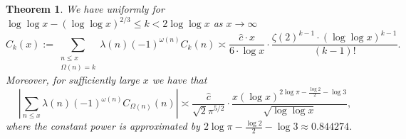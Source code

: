 \documentclass[11pt,reqno,a4letter]{article}
\numberwithin{figure}{section}
\numberwithin{table}{section}
\theoremstyle{plain}
\newtheorem{theorem}{Theorem}
\numberwithin{theorem}{section}
\theoremstyle{definition}
\begin{document}
\begin{theorem}
We have uniformly for 
$\log\log x - (\log\log x)^{2/3} \leq k < 2\log\log x$ 
as $x \rightarrow \infty$ 
\[
\widehat{C}_k(x) := 
     \sum_{\substack{n \leq x \\ \Omega(n) = k}} \lambda(n) (-1)^{\omega(n)} 
     C_k(n) \asymp \frac{\widehat{c} \cdot x}{6 \cdot \log x} \cdot 
     \frac{\zeta(2)^{k-1} \cdot (\log\log x)^{k-1}}{(k-1)!}. 
\]
Moreover, for sufficiently large $x$ we have that 
\[
\left\lvert \sum_{n \leq x} \lambda(n) 
     (-1)^{\omega(n)} C_{\Omega(n)}(n) \right\rvert \asymp 
     \frac{\widehat{c}}{\sqrt{2} \pi^{5/2}} \cdot 
     \frac{x (\log x)^{2\log\pi - \frac{\log 2}{2} - \log 3}}{\sqrt{\log\log x}}, 
\] 
where the constant power is approximated by 
$2\log\pi - \frac{\log 2}{2} - \log 3 \approx 0.844274$. 
\end{theorem} 
\end{document}
